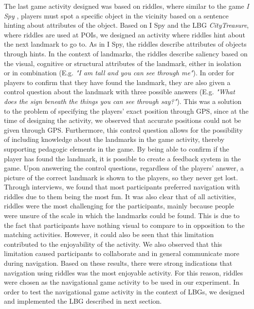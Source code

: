 The last game activity designed was based on riddles, where similar to the game \textit{I Spy} \cite{childrensGames}, players must spot a specific object in the vicinity based on a sentence hinting about attributes of the object. Based on I Spy and the LBG \textit{CityTreasure}, where riddles are used at POIs, we designed an activity where riddles hint about the next landmark to go to. As in I Spy, the riddles describe attributes of objects through hints.
In the context of landmarks, the riddles describe saliency based on the visual, cognitive or structural attributes of the landmark, either in isolation or in combination (E.g. \textit{"I am tall and you can see through me"}). In order for players to confirm that they have found the landmark, they are also given a control question about the landmark with three possible answers (E.g. \textit{"What does the sign beneath the things you can see through say?"}). This was a solution to the problem of specifying the players' exact position through GPS, since at the time of designing the activity, we observed that accurate positions could not be given through GPS. Furthermore, this control question allows for the possibility of including knowledge about the landmarks in the game activity, thereby supporting pedagogic elements in the game. By being able to confirm if the player has found the landmark, it is possible to create a feedback system in the game. Upon answering the control questions, regardless of the players' answer, a picture of the correct landmark is shown to the players, so they never get lost. Through interviews, we found that most participants preferred navigation with riddles due to them being the most fun. It was also clear that of all activities, riddles were the most challenging for the participants, mainly because people were unsure of the scale in which the landmarks could be found. This is due to the fact that participants have nothing visual to compare to in opposition to the matching activities. However, it could also be seen that this limitation contributed to the enjoyability of the activity. We also observed that this limitation caused participants to collaborate and in general communicate more during navigation. Based on these results, there were strong indications that navigation using riddles was the most enjoyable activity. For this reason, riddles were chosen as the navigational game activity to be used in our experiment. In order to test the navigational game activity in the context of LBGs, we designed and implemented the LBG described in next section. 

